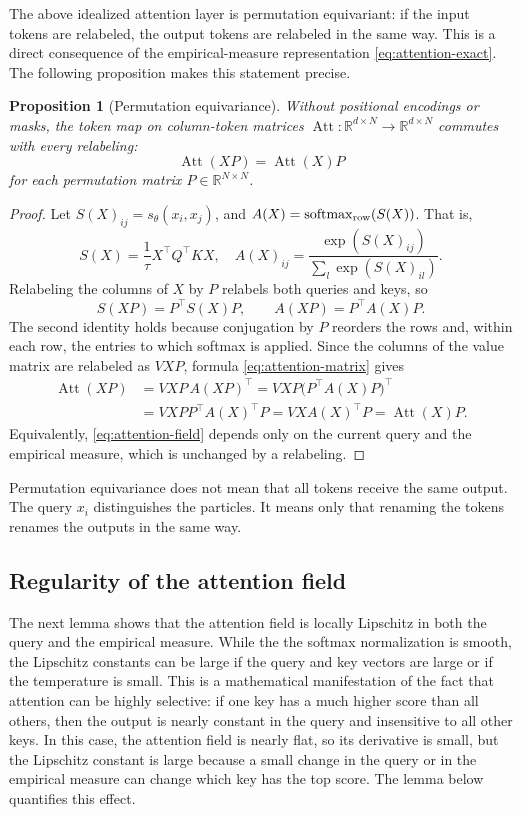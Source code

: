 \documentclass[11pt]{amsart}
\numberwithin{equation}{section}
\theoremstyle{plain}
\newtheorem{proposition}[theorem]{Proposition}
\newcommand{\R}{\mathbb{R}}
\begin{document}
The above idealized attention layer is permutation equivariant: if the input tokens are relabeled, the output tokens are relabeled in the same way.  This is a direct consequence of the empirical-measure representation \eqref{eq:attention-exact}.  The following proposition makes this statement precise. 
\begin{proposition}[Permutation equivariance]\label{prop:perm-equiv}
Without positional encodings or masks, the token map on column-token matrices
$\operatorname{Att}:\R^{d\times N}\to\R^{d\times N}$ commutes with every
relabeling:
\[
  \operatorname{Att}(XP)=\operatorname{Att}(X)P
\]
for each permutation matrix $P\in\R^{N\times N}$.
\end{proposition}
\begin{proof}
Let $S(X)_{ij}=s_\theta(x_i,x_j)$,  and
$A(X)=\operatorname{softmax}_{\rm row}(S(X)) $. That is,
$$S(X)= \frac{1}{\tau} X^\top Q^\top K X, \quad A(X)_{ij}= \frac{\exp(S(X)_{ij})}{\sum_l \exp(S(X)_{il})}.$$
Relabeling the columns of
$X$ by $P$ relabels both queries and keys, so
\[
 S(XP)=P^\top S(X)P,
 \qquad
 A(XP)=P^\top A(X)P.
\]
The second identity holds because conjugation by $P$ reorders the rows and,
within each row, the entries to which softmax is applied.  Since the columns
of the value matrix are relabeled as $VXP$, formula
\eqref{eq:attention-matrix} gives
\[
\begin{split}
 \operatorname{Att}(XP)
 &=VXP\,A(XP)^\top
  =VXP\bigl(P^\top A(X)P\bigr)^\top\\
 &=VXP P^\top A(X)^\top P
  =VXA(X)^\top P
  =\operatorname{Att}(X)P.
\end{split}
\]
Equivalently, \eqref{eq:attention-field} depends only on the current query
and the empirical measure, which is unchanged by a relabeling.
\end{proof}

Permutation equivariance does not mean that all tokens receive the same
output.  The query $x_i$ distinguishes the particles.  It means only that
renaming the tokens renames the outputs in the same way.



\subsection{Regularity of the attention field}

The next lemma shows that the attention field is locally Lipschitz in both the query and the empirical measure.  While the the softmax normalization is smooth, the Lipschitz constants can be large if the query and key vectors are large or if the temperature is small.  This is a mathematical manifestation of the fact that attention can be highly selective: if one key has a much higher score than all others, then the output is nearly constant in the query and insensitive to all other keys.  In this case, the attention field is nearly flat, so its derivative is small, but the Lipschitz constant is large because a small change in the query or in the empirical measure can change which key has the top score.  The lemma below quantifies this effect.
\end{document}
